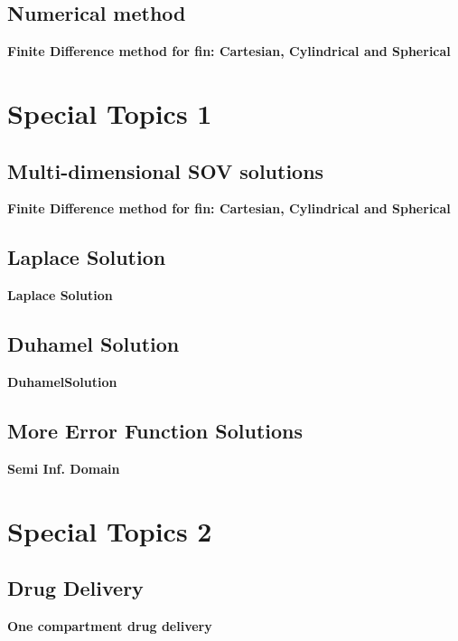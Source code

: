 \subsection{Numerical method}
\begin{example}
\textbf{Finite Difference method for fin: Cartesian, Cylindrical and Spherical}
\end{example}

\appendix

\section{Special Topics 1}
\subsection{Multi-dimensional SOV solutions}

\begin{example}
\textbf{Finite Difference method for fin: Cartesian, Cylindrical and Spherical}
\end{example}

\subsection{Laplace Solution}
\begin{example}
\textbf{Laplace Solution}
\end{example}

\subsection{Duhamel Solution}
\begin{example}
\textbf{DuhamelSolution}
\end{example}

\subsection{More Error Function Solutions}
\begin{example}
\textbf{Semi Inf. Domain}
\end{example}

\section{Special Topics 2}
\subsection{Drug Delivery}
\begin{example}
\textbf{One compartment drug delivery}
\end{example}


